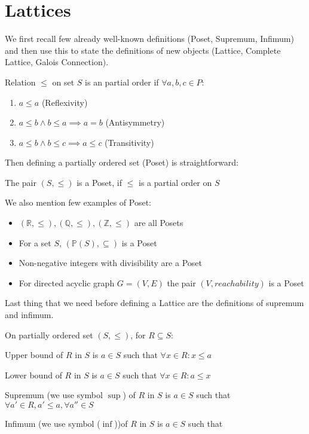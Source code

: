 \section{Lattices} %

We first recall few already well-known definitions (Poset, Supremum, Infimum) and then use this
to state the definitions of new objects (Lattice, Complete Lattice, Galois Connection).

\begin{defn}
    Relation $\leq$ on set $S$ is an partial order if $\forall a, b, c \in P$:
    \begin{enumerate}
        \item $a \leq a$ (Reflexivity)
        \item $a \leq b \land b \leq a \implies a = b$ (Antisymmetry)
        \item $a \leq b \land b \leq c \implies a \leq c$ (Transitivity)
    \end{enumerate}
\end{defn}

Then defining a partially ordered set (Poset) is straightforward:

\begin{defn}[Poset]
    The pair $(S, \leq)$ is a Poset, if $\leq$ is a partial order on $S$
\end{defn}

\begin{example}
    We also mention few examples of Poset:
    \begin{itemize}
        \item $(\mathbb{R}, \leq), (\mathbb{Q}, \leq), (\mathbb{Z}, \leq)$ are all Posets
        \item For a set $S$, $(\mathbb{P}(S), \subseteq)$ is a Poset
        \item Non-negative integers with divisibility are a Poset
        \item For directed acyclic graph $G=(V,E)$ the pair $(V, reachability)$ is a Poset
    \end{itemize}
\end{example}

Last thing that we need before defining a Lattice are the definitions of supremum and infimum.

\begin{defn}
    On partially ordered set $(S, \leq)$, for $R \subseteq S$:

    Upper bound of $R$ in $S$ is $a \in S$ such that $\forall x \in R: x \leq a$

    Lower bound of $R$ in $S$ is $a \in S$ such that $\forall x \in R: a \leq x$

    Supremum (we use symbol $\sup$) of $R$ in $S$ is $a \in S$
    such that $\forall a' \in R, a' \leq a, \forall a'' \in S$ %

    Infimum (we use symbol ($\inf$))of $R$ in $S$ is $a \in S$ such that
\end{defn}

